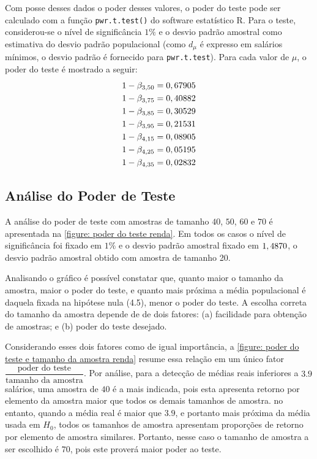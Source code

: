	Com posse desses dados o poder desses valores, o poder do teste
    pode ser calculado com a função \texttt{pwr.t.test()} do software
    estatístico R. Para o teste, considerou-se o nível de
    significância $1\%$ e o desvio padrão amostral como estimativa do
    desvio padrão populacional (como $d_\mu$ é expresso em salários
    mínimos, o desvio padrão é fornecido para
    \texttt{pwr.t.test}). Para cada valor de $\mu$, o poder do teste é
    mostrado a seguir:
	\begin{align*}
		1 - \beta_{3,50} &= 0,67905\\
		1 - \beta_{3,75} &= 0,40882\\
		1 - \beta_{3,85} &= 0,30529\\
		1 - \beta_{3,95} &= 0,21531\\
		1 - \beta_{4,15} &= 0,08905\\
		1 - \beta_{4,25} &= 0,05195\\
		1 - \beta_{4,35} &= 0,02832\\
	\end{align*}

\subsection{Análise do Poder de Teste}

	A análise do poder de teste com amostras de tamanho $40$, $50$, $60$ e $70$
	é apresentada na \autoref{figure: poder do teste renda}. Em todos os casos o
	nível de significância foi fixado em $1\%$ e o desvio padrão amostral fixado
	em $1,4870$, o desvio padrão amostral obtido com amostra de
	tamanho 20.

	Analisando o gráfico é possível constatar que, quanto maior o tamanho da
	amostra, maior o poder do teste, e quanto mais próxima a média populacional
	é daquela fixada na hipótese nula (4.5), menor o poder do teste. A escolha correta
	do tamanho da amostra depende de de dois fatores: (a) facilidade para
	obtenção de amostras; e (b) poder do teste desejado.
	
	Considerando esses dois fatores como de igual importância, a
    \autoref{figure: poder do teste e tamanho da amostra renda} resume
    essa relação em um único fator $\dfrac{\text{poder do
        teste}}{\text{tamanho da amostra}}$. Por análise, para a detecção de
    médias reais inferiores a $3.9$ salários, uma amostra de $40$ é
    a mais indicada, pois esta apresenta retorno por elemento da
    amostra maior que todos os demais tamanhos de amostra.  no entanto,
    quando a média real é maior que $3.9$, e portanto mais próxima da
    média usada em $H_0$, todos os tamanhos de amostra apresentam
    proporções de retorno por elemento de amostra similares. Portanto,
    nesse caso o tamanho de amostra a ser escolhido é $70$, pois este
    proverá maior poder ao teste.


